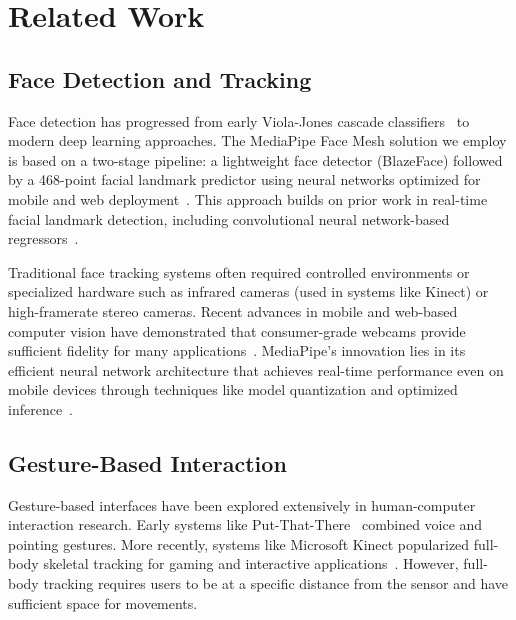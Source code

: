\documentclass[sigconf]{acmart}
\begin{document}
\section{Related Work}
\label{sec:related}

\subsection{Face Detection and Tracking}

Face detection has progressed from early Viola-Jones cascade classifiers~\cite{viola2004robust} to modern deep learning approaches. The MediaPipe Face Mesh solution we employ is based on a two-stage pipeline: a lightweight face detector (BlazeFace) followed by a 468-point facial landmark predictor using neural networks optimized for mobile and web deployment~\cite{bazarevsky2019blazeface,kartynnik2019real}. This approach builds on prior work in real-time facial landmark detection, including convolutional neural network-based regressors~\cite{sun2013deep,cao2014face}.

Traditional face tracking systems often required controlled environments or specialized hardware such as infrared cameras (used in systems like Kinect) or high-framerate stereo cameras. Recent advances in mobile and web-based computer vision have demonstrated that consumer-grade webcams provide sufficient fidelity for many applications~\cite{lugaresi2019mediapipe}. MediaPipe's innovation lies in its efficient neural network architecture that achieves real-time performance even on mobile devices through techniques like model quantization and optimized inference~\cite{bazarevsky2019blazeface}.

\subsection{Gesture-Based Interaction}

Gesture-based interfaces have been explored extensively in human-computer interaction research. Early systems like Put-That-There~\cite{bolt1980put} combined voice and pointing gestures. More recently, systems like Microsoft Kinect popularized full-body skeletal tracking for gaming and interactive applications~\cite{shotton2011real}. However, full-body tracking requires users to be at a specific distance from the sensor and have sufficient space for movements.
\end{document}
